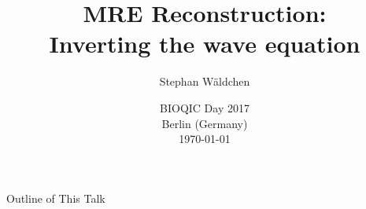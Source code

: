 \title[Superimposed Sensor Measurements]{MRE Reconstruction: \\ Inverting the wave equation}
\author[Genzel \& Jung (TU Berlin)]{Stephan W\"{a}ldchen}

\date[SPARS 2017]{BIOQIC Day 2017\\[.25em] Berlin (Germany) \\[.25em] \today \\[1ex]}
\newcommand{\mylogo}{\texttt{[image: Images/TU\_logo.pdf]}}

\begin{frame}[plain]
	\titlepage
\end{frame}



% 
% 
% 
% 

\begin{frame}[noframenumbering]{Outline of This Talk}
	\tableofcontents
\end{frame}